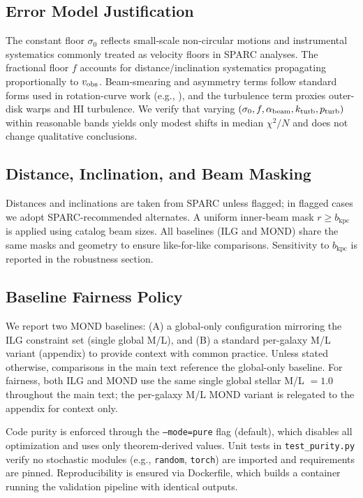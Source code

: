 \documentclass[12pt,a4paper]{article}
\begin{document}
\subsection{Error Model Justification}
\noindent The constant floor $\sigma_0$ reflects small-scale non-circular motions and instrumental systematics commonly treated as velocity floors in SPARC analyses. The fractional floor $f$ accounts for distance/inclination systematics propagating proportionally to $v_{\rm obs}$. Beam-smearing and asymmetry terms follow standard forms used in rotation-curve work (e.g., \citealp{lelli2016sparc,mcgaugh2016}), and the turbulence term proxies outer-disk warps and HI turbulence. We verify that varying $(\sigma_0,f,\alpha_{\rm beam},k_{\rm turb},p_{\rm turb})$ within reasonable bands yields only modest shifts in median $\chi^2/N$ and does not change qualitative conclusions.

\subsection{Distance, Inclination, and Beam Masking}
\noindent Distances and inclinations are taken from SPARC unless flagged; in flagged cases we adopt SPARC-recommended alternates. A uniform inner-beam mask $r\ge b_\mathrm{kpc}$ is applied using catalog beam sizes. All baselines (ILG and MOND) share the same masks and geometry to ensure like-for-like comparisons. Sensitivity to $b_\mathrm{kpc}$ is reported in the robustness section.

\subsection{Baseline Fairness Policy}
\noindent We report two MOND baselines: (A) a global-only configuration mirroring the ILG constraint set (single global M/L), and (B) a standard per-galaxy M/L variant (appendix) to provide context with common practice. Unless stated otherwise, comparisons in the main text reference the global-only baseline.
For fairness, both ILG and MOND use the same single global stellar M/L $=1.0$ throughout the main text; the per-galaxy M/L MOND variant is relegated to the appendix for context only.

Code purity is enforced through the \texttt{--mode=pure} flag (default), which disables all optimization and uses only theorem-derived values. Unit tests in \texttt{test\_purity.py} verify no stochastic modules (e.g., \texttt{random}, \texttt{torch}) are imported and requirements are pinned. Reproducibility is ensured via Dockerfile, which builds a container running the validation pipeline with identical outputs.
\end{document}
